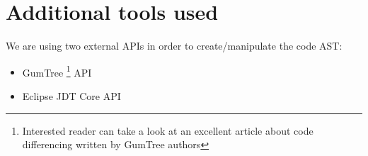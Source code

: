 \section{Additional tools used}
\label{sec:Tools}

We are using two external APIs in order to create/manipulate the code AST:

\begin{itemize}
    \item GumTree \footnote{Interested reader can take a look at an excellent article \cite{DBLP:conf/kbse/FalleriMBMM14} about code differencing written by GumTree authors} API \cite{GumTree}
    \item Eclipse JDT Core API \cite{JDT}
\end{itemize}
